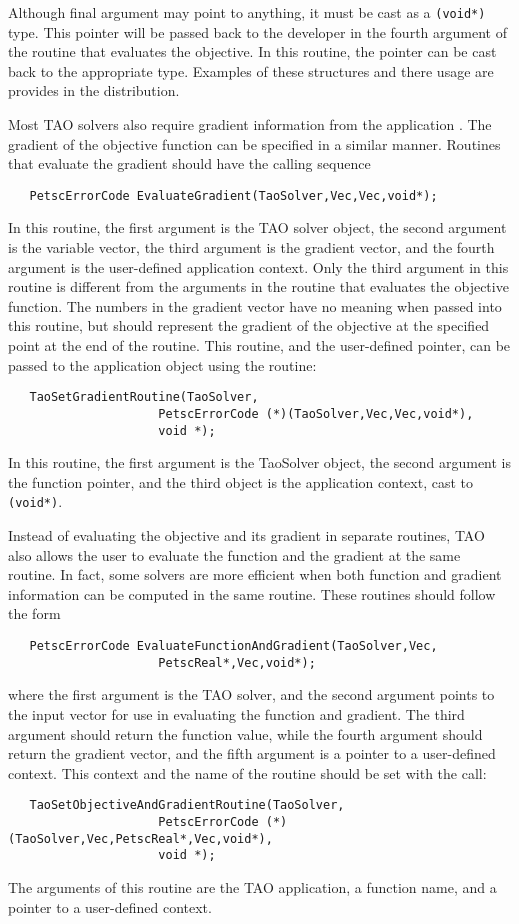 Although final argument may point to anything, it must be cast as a {\tt (void*)} type.
This pointer will be passed back to the developer in the fourth argument of the
routine that evaluates the objective.  In this routine, the pointer can be cast
back to the appropriate type.  Examples of these structures and there usage
are provides in the distribution.


   Most TAO solvers also require gradient information from the 
application .
  The gradient of the objective function can be specified in a similar manner.
Routines that evaluate the gradient should have the calling sequence
\begin{verbatim}
   PetscErrorCode EvaluateGradient(TaoSolver,Vec,Vec,void*);
\end{verbatim}
\noindent
In this routine, the first
argument is the TAO solver object, the second argument is the variable
vector, the third argument is the gradient vector, and the fourth argument is
the user-defined application context.  Only the third argument in this
routine is different from the arguments in the routine that evaluates
the objective function.  The numbers in the gradient vector have no
meaning when passed into this routine, but should represent the gradient
of the objective at the specified point at the end of the routine.
This routine, and the user-defined pointer, can be passed to the application
object using the routine: 
\begin{verbatim}
   TaoSetGradientRoutine(TaoSolver,
                     PetscErrorCode (*)(TaoSolver,Vec,Vec,void*),
                     void *);
\end{verbatim}
\noindent
In this routine, the first argument is the TaoSolver object, the second argument
is the function pointer, and the third object is the application context, cast
to {\tt (void*)}.

   Instead of evaluating the objective and its gradient in separate
routines, TAO also allows the user to evaluate the function and the gradient
at the same routine.  In fact, some solvers are more efficient when
both function and gradient information can be computed in the same routine.
These routines should follow the form
\begin{verbatim}
   PetscErrorCode EvaluateFunctionAndGradient(TaoSolver,Vec,
                     PetscReal*,Vec,void*);
\end{verbatim}
\noindent
where the first
argument is the TAO solver, and the second
argument points to the input vector for use in evaluating the
function and gradient. The third argument should return the
function value, while the fourth argument should return the gradient vector,
and the fifth argument is a pointer to a user-defined context.
This context and the name of the routine should be set with the
call: 
\begin{verbatim}
   TaoSetObjectiveAndGradientRoutine(TaoSolver,
                     PetscErrorCode (*)(TaoSolver,Vec,PetscReal*,Vec,void*),
                     void *);
\end{verbatim}
\noindent
The arguments of this routine are the TAO application, a
function name, and a pointer to a user-defined context.


